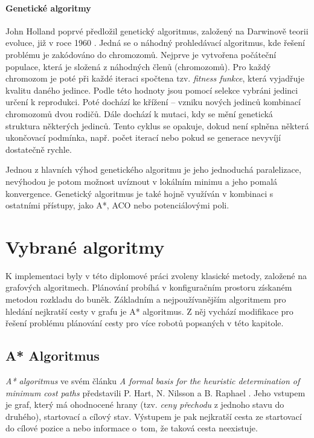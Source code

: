 \subsubsection{Genetické algoritmy}
John Holland poprvé předložil genetický algoritmus, založený na Darwinově teorii evoluce, již v roce 1960 \cite{Alajlan2013,Masehian2007,Lamini2018,Gao2008}. Jedná se o náhodný prohledávací algoritmus, kde řešení problému je zakódováno do chromozomů. Nejprve je vytvořena počáteční populace, která je složená z náhodných členů (chromozomů). Pro každý chromozom je poté při každé iteraci spočtena tzv. \emph{fitness funkce}, která vyjadřuje kvalitu daného jedince. Podle této hodnoty jsou pomocí selekce vybráni jedinci určení k reprodukci. Poté dochází ke křížení -- vzniku nových jedinců kombinací chromozomů dvou rodičů. Dále dochází k mutaci, kdy se mění genetická struktura některých jedinců. Tento cyklus se opakuje, dokud není splněna některá ukončovací podmínka, např. počet iterací nebo pokud se generace nevyvíjí dostatečně rychle. 

Jednou z hlavních výhod genetického algoritmu je jeho jednoduchá paralelizace, nevýhodou je potom možnost uvíznout v lokálním minimu a jeho pomalá konvergence. Genetický algoritmus je také hojně využíván v kombinaci s ostatními přístupy, jako A*, ACO nebo potenciálovými poli. 


\cleardoublepage
\chapter{Vybrané algoritmy}\label{sec:algos}

K implementaci byly v této diplomové práci zvoleny klasické metody, založené na grafových algoritmech. Plánování probíhá v konfiguračním prostoru získaném metodou rozkladu do buněk. Základním a nejpoužívanějším algoritmem pro hledání nejkratší cesty v grafu je A* algoritmus. Z něj vychází modifikace pro řešení problému plánování cesty pro více robotů popsaných v této kapitole.

\section{A* Algoritmus}\label{sec:Astar}
\emph{A* algoritmus} ve svém článku \emph{A formal basis for the heuristic determination of minimum cost paths} představili P. Hart, N. Nilsson a B. Raphael \cite{Hart1968}. Jeho vstupem je graf, který má ohodnocené hrany (tzv. \emph{ceny přechodu} z jednoho stavu do druhého), startovací a cílový stav. Výstupem je pak nejkratší cesta ze startovací do cílové pozice a nebo informace o~tom, že taková cesta neexistuje. 

